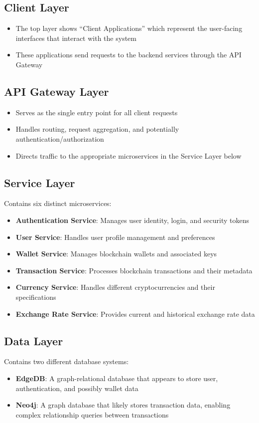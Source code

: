 \subsection{Client Layer}
\begin{itemize}
  \item The top layer shows ``Client Applications'' which represent the user-facing interfaces that interact with the system
  \item These applications send requests to the backend services through the API Gateway
\end{itemize}

\subsection{API Gateway Layer}
\begin{itemize}
  \item Serves as the single entry point for all client requests
  \item Handles routing, request aggregation, and potentially authentication/authorization
  \item Directs traffic to the appropriate microservices in the Service Layer below
\end{itemize}

\subsection{Service Layer}
Contains six distinct microservices:
\begin{itemize}
  \item \textbf{Authentication Service}: Manages user identity, login, and security tokens
  \item \textbf{User Service}: Handles user profile management and preferences
  \item \textbf{Wallet Service}: Manages blockchain wallets and associated keys
  \item \textbf{Transaction Service}: Processes blockchain transactions and their metadata
  \item \textbf{Currency Service}: Handles different cryptocurrencies and their specifications
  \item \textbf{Exchange Rate Service}: Provides current and historical exchange rate data
\end{itemize}

\subsection{Data Layer}
Contains two different database systems:
\begin{itemize}
  \item \textbf{EdgeDB}: A graph-relational database that appears to store user, authentication, and possibly wallet data
  \item \textbf{Neo4j}: A graph database that likely stores transaction data, enabling complex relationship queries between transactions
\end{itemize}

